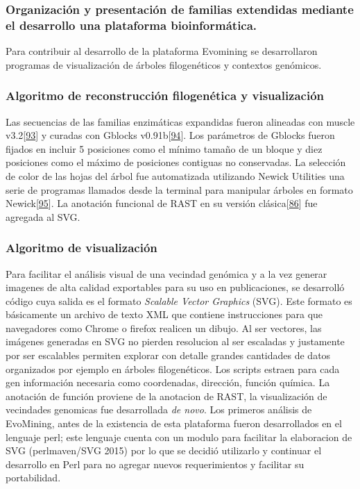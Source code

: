 \documentclass[12pt,twoside]{reedthesis}
\begin{document}
  \subsubsection{Organización y presentación de familias extendidas
  mediante el desarrollo una plataforma
  bioinformática.}\label{organizacion-y-presentacion-de-familias-extendidas-mediante-el-desarrollo-una-plataforma-bioinformatica.}
  
  Para contribuir al desarrollo de la plataforma Evomining se
  desarrollaron programas de visualización de árboles filogenéticos y
  contextos genómicos.
  
  \subsubsection{Algoritmo de reconstrucción filogenética y
  visualización}\label{algoritmo-de-reconstruccion-filogenetica-y-visualizacion}
  
  Las secuencias de las familias enzimáticas expandidas fueron alineadas
  con muscle v3.2{[}\protect\hyperlink{ref-edgar_muscle_2004}{93}{]} y
  curadas con Gblocks
  v0.91b{[}\protect\hyperlink{ref-castresana_selection_2000}{94}{]}. Los
  parámetros de Gblocks fueron fijados en incluir 5 posiciones como el
  mínimo tamaño de un bloque y diez posiciones como el máximo de
  posiciones contiguas no conservadas. La selección de color de las hojas
  del árbol fue automatizada utilizando Newick Utilities una serie de
  programas llamados desde la terminal para manipular árboles en formato
  Newick{[}\protect\hyperlink{ref-junier_newick_2010}{95}{]}. La anotación
  funcional de RAST en su versión
  clásica{[}\protect\hyperlink{ref-aziz_rast_2008}{86}{]} fue agregada al
  SVG.
  
  \subsubsection{Algoritmo de
  visualización}\label{algoritmo-de-visualizacion}
  
  Para facilitar el análisis visual de una vecindad genómica y a la vez
  generar imagenes de alta calidad exportables para su uso en
  publicaciones, se desarrolló código cuya salida es el formato
  \emph{Scalable Vector Graphics} (SVG). Este formato es básicamente un
  archivo de texto XML que contiene instrucciones para que navegadores
  como Chrome o firefox realicen un dibujo. Al ser vectores, las imágenes
  generadas en SVG no pierden resolucion al ser escaladas y justamente por
  ser escalables permiten explorar con detalle grandes cantidades de datos
  organizados por ejemplo en árboles filogenéticos. Los scripts estraen
  para cada gen información necesaria como coordenadas, dirección, función
  química. La anotación de función proviene de la anotacion de RAST, la
  visualización de vecindades genomicas fue desarrollada \emph{de novo}.
  Los primeros análisis de EvoMining, antes de la existencia de esta
  plataforma fueron desarrollados en el lenguaje perl; este lenguaje
  cuenta con un modulo para facilitar la elaboracion de SVG (perlmaven/SVG
  2015) por lo que se decidió utilizarlo y continuar el desarrollo en Perl
  para no agregar nuevos requerimientos y facilitar su portabilidad.
  
\end{document}
